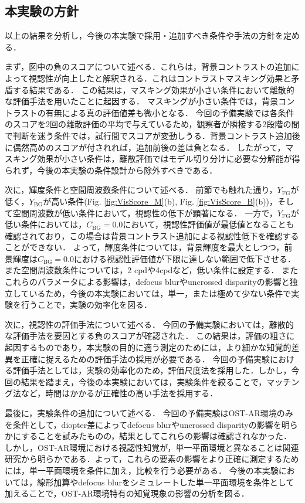 \documentclass[a4j,10pt,fleqn]{rinkoj}
\begin{document}
\subsection{本実験の方針}
以上の結果を分析し，今後の本実験で採用・追加すべき条件や手法の方針を定める．

まず，図中の負のスコアについて述べる．これらは，背景コントラストの追加によって視認性が向上したと解釈される．これはコントラストマスキング効果と矛盾する結果である．
この結果は，マスキング効果が小さい条件において離散的な評価手法を用いたことに起因する．
マスキングが小さい条件では，背景コントラストの有無による真の評価値差も微小となる．
今回の予備実験では各条件のスコアを2回の離散評価の平均で与えているため，観察者が隣接する2段階の間で判断を迷う条件では，試行間でスコアが変動しうる．背景コントラスト追加後に偶然高めのスコアが付されれば，追加前後の差は負となる．
したがって，マスキング効果が小さい条件は，離散評価ではモデル切り分けに必要な分解能が得られず，今後の本実験の条件設計から除外すべきである．

次に，輝度条件と空間周波数条件について述べる．
前節でも触れた通り，$Y_{\mathrm{FG}}$が低く，$Y_{\mathrm{BG}}$が高い条件(Fig. \ref{fig:VisScore_M}(b), Fig. \ref{fig:VisScore_B}(b))，そして空間周波数が低い条件において，視認性の低下が顕著になる．
一方で，$Y_{\mathrm{FG}}$が低い条件においては，$C_{\mathrm{BG}}=0.0$において，視認性評価値が最低値となることも確認されており，この場合は背景コントラスト追加による視認性低下を確認することができない．
よって，輝度条件については，背景輝度を最大としつつ，前景輝度は$C_{\mathrm{BG}}=0.0$における視認性評価値が下限に達しない範囲で低下させる．また空間周波数条件については，2 cpdや4cpdなど，低い条件に設定する．
またこれらのパラメータによる影響は，defocus blurやuncrossed disparityの影響と独立しているため，今後の本実験においては，単一，または極めて少ない条件で実験を行うことで，実験の効率化を図る．

次に，視認性の評価手法について述べる．
今回の予備実験においては，離散的な評価手法を要因とする負のスコアが確認された．
この結果は，評価の粗さに起因するものであり，本実験の目的に適う測定のためには，より細かな知覚的差異を正確に捉えるための評価手法の採用が必要である．
今回の予備実験における評価手法としては，実験の効率化のため，評価尺度法を採用した．しかし，今回の結果を踏まえ，今後の本実験においては，実験条件を絞ることで，マッチング法など，時間はかかるが正確性の高い手法を採用する．

最後に，実験条件の追加について述べる．
今回の予備実験はOST-AR環境のみを条件として，diopter差によってdefocus blurやuncrossed disparityの影響を明らかにすることを試みたものの，結果としてこれらの影響は確認されなかった．
しかし，OST-AR環境における視認性知覚が，単一平面環境と異なることは関連研究から明らかである．よって，これらの要素の影響をより正確に測定するためには，単一平面環境を条件に加え，比較を行う必要がある．
今後の本実験においては，線形加算やdefocus blurをシミュレートした単一平面環境を条件として加えることで，OST-AR環境特有の知覚現象の影響の分析を図る．
\end{document}
